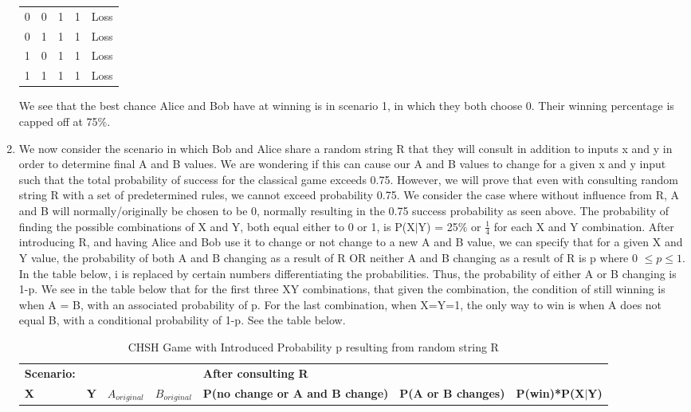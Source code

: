 \documentclass{article}
\begin{document}
\begin{enumerate}
\begin{table}[H]
\begin{tabular}{lllll}
0 & 0 & 1 & 1 & Loss \\
0 & 1 & 1 & 1 & Loss \\
1 & 0 & 1 & 1 & Loss \\
1 & 1 & 1 & 1 & Loss
\end{tabular}
\end{table}
    We see that the best chance Alice and Bob have at winning is in scenario 1, in which they both choose 0. Their winning percentage is capped off at 75$\%$.
    \item We now consider the scenario in which Bob and Alice share a random string R that they will consult in addition to inputs x and y in order to determine final A and B values. We are wondering if this can cause our A and B values to change for a given x and y input such that the total probability of success for the classical game exceeds 0.75. However, we will prove that even with consulting random string R with a set of predetermined rules, we cannot exceed probability 0.75. We consider the case where without influence from R, A and B will normally/originally be chosen to be 0, normally resulting in the 0.75 success probability as seen above. The probability of finding the possible combinations of X and Y, both equal either to 0 or 1, is P(X$|$Y) = 25$\%$ or $\frac{1}{4}$ for each X and Y combination. After introducing R, and having Alice and Bob use it to change or not change to a new A and B value, we can specify that for a given X and Y value, the probability of both A and B changing as a result of R OR neither A and B changing as a result of R is p where 0 $\leq p \leq 1$. In the table below, i is replaced by certain numbers differentiating the probabilities. Thus, the probability of either A or B changing is 1-p. We see in the table below that for the first three XY combinations, that given the combination, the condition of still winning is when A = B, with an associated probability of p. For the last combination, when X=Y=1, the only way to win is when A does not equal B, with a conditional probability of 1-p. See the table below.
    \begin{table}[H]
\centering
\caption{CHSH Game with Introduced Probability p resulting from random string R}
\label{my-label}
\begin{tabular}{lllllll}
\textbf{Scenario:} & \multicolumn{1}{l|}{\textbf{}} & \textbf{} & \multicolumn{1}{l|}{\textbf{}} & \textbf{After consulting R} & \textbf{} & \textbf{} \\ \cline{1-4}
\textbf{X} & \textbf{Y} & \textbf{$A_{original}$} & \textbf{$B_{original}$} & \textbf{P(no change or A and B change)} & \textbf{P(A or B changes)} & \textbf{P(win)*P(X$|$Y)} \\

\end{tabular}
\end{table}
\end{enumerate}
\end{document}
